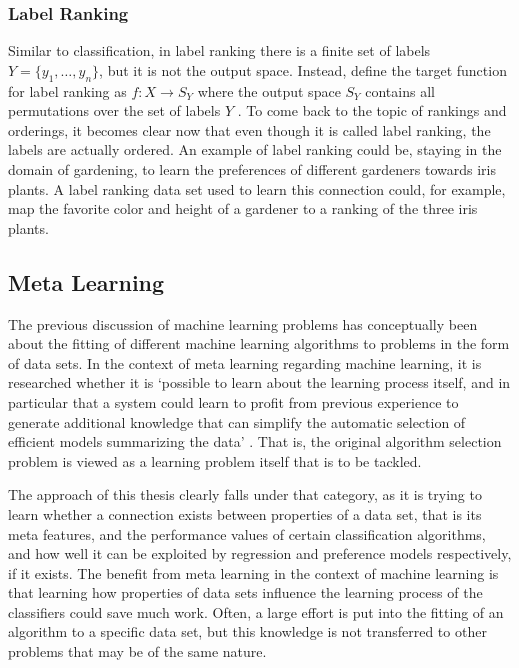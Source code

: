 \subsubsection{Label Ranking}
Similar to classification, in label ranking there is a finite set of labels $Y=\lbrace y_1,\dots,y_n \rbrace$, but it is not the output space. Instead, \citeauthor{DBLP:books/daglib/0025729} define the target function for label ranking as $f:X\rightarrow S_Y$ where the output space $S_Y$ contains all permutations over the set of labels $Y$ \cite{DBLP:books/daglib/0025729}. To come back to the topic of rankings and orderings, it becomes clear now that even though it is called label ranking, the labels are actually ordered. An example of label ranking could be, staying in the domain of gardening, to learn the preferences of different gardeners towards iris plants. A label ranking data set used to learn this connection could, for example, map the favorite color and height of a gardener to a ranking of the three iris plants. 

\subsection{Meta Learning}
The previous discussion of machine learning problems has conceptually been about the fitting of different machine learning algorithms to problems in the form of data sets. In the context of meta learning regarding machine learning, it is researched whether it is `possible to learn about the learning process itself, and in particular that a system could learn to profit from previous experience to generate additional knowledge that can simplify the automatic selection of efficient models summarizing the data' \cite{brazdil2008metalearning}. That is, the original algorithm selection problem \cite{rice1976algorithm} is viewed as a learning problem itself that is to be tackled.

The approach of this thesis clearly falls under that category, as it is trying to learn whether a connection exists between properties of a data set, that is its meta features, and the performance values of certain classification algorithms, and how well it can be exploited by regression and preference models respectively, if it exists. The benefit from meta learning in the context of machine learning is that learning how properties of data sets influence the learning process of the classifiers could save much work. Often, a large effort is put into the fitting of an algorithm to a specific data set, but this knowledge is not transferred to other problems that may be of the same nature.

